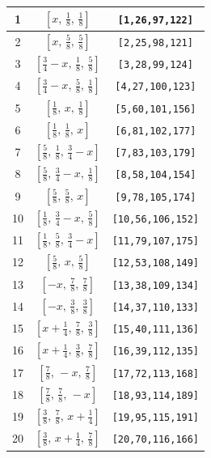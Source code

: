 \documentclass[fleqn,8pt]{jsarticle}
\begin{document}
\begin{longtable}{ccc}
1 & $\left[ x,\, \frac{1}{8},\, \frac{1}{8} \right]$ & {\tt [1,26,97,122]} \\ \hline
2 & $\left[ x,\, \frac{5}{8},\, \frac{5}{8} \right]$ & {\tt [2,25,98,121]} \\ \hline
3 & $\left[ \frac{3}{4} - x,\, \frac{1}{8},\, \frac{5}{8} \right]$ & {\tt [3,28,99,124]} \\ \hline
4 & $\left[ \frac{3}{4} - x,\, \frac{5}{8},\, \frac{1}{8} \right]$ & {\tt [4,27,100,123]} \\ \hline
5 & $\left[ \frac{1}{8},\, x,\, \frac{1}{8} \right]$ & {\tt [5,60,101,156]} \\ \hline
6 & $\left[ \frac{1}{8},\, \frac{1}{8},\, x \right]$ & {\tt [6,81,102,177]} \\ \hline
7 & $\left[ \frac{5}{8},\, \frac{1}{8},\, \frac{3}{4} - x \right]$ & {\tt [7,83,103,179]} \\ \hline
8 & $\left[ \frac{5}{8},\, \frac{3}{4} - x,\, \frac{1}{8} \right]$ & {\tt [8,58,104,154]} \\ \hline
9 & $\left[ \frac{5}{8},\, \frac{5}{8},\, x \right]$ & {\tt [9,78,105,174]} \\ \hline
10 & $\left[ \frac{1}{8},\, \frac{3}{4} - x,\, \frac{5}{8} \right]$ & {\tt [10,56,106,152]} \\ \hline
11 & $\left[ \frac{1}{8},\, \frac{5}{8},\, \frac{3}{4} - x \right]$ & {\tt [11,79,107,175]} \\ \hline
12 & $\left[ \frac{5}{8},\, x,\, \frac{5}{8} \right]$ & {\tt [12,53,108,149]} \\ \hline
13 & $\left[ - x,\, \frac{7}{8},\, \frac{7}{8} \right]$ & {\tt [13,38,109,134]} \\ \hline
14 & $\left[ - x,\, \frac{3}{8},\, \frac{3}{8} \right]$ & {\tt [14,37,110,133]} \\ \hline
15 & $\left[ x + \frac{1}{4},\, \frac{7}{8},\, \frac{3}{8} \right]$ & {\tt [15,40,111,136]} \\ \hline
16 & $\left[ x + \frac{1}{4},\, \frac{3}{8},\, \frac{7}{8} \right]$ & {\tt [16,39,112,135]} \\ \hline
17 & $\left[ \frac{7}{8},\, - x,\, \frac{7}{8} \right]$ & {\tt [17,72,113,168]} \\ \hline
18 & $\left[ \frac{7}{8},\, \frac{7}{8},\, - x \right]$ & {\tt [18,93,114,189]} \\ \hline
19 & $\left[ \frac{3}{8},\, \frac{7}{8},\, x + \frac{1}{4} \right]$ & {\tt [19,95,115,191]} \\ \hline
20 & $\left[ \frac{3}{8},\, x + \frac{1}{4},\, \frac{7}{8} \right]$ & {\tt [20,70,116,166]} \\ \hline

\end{longtable}
\end{document}
